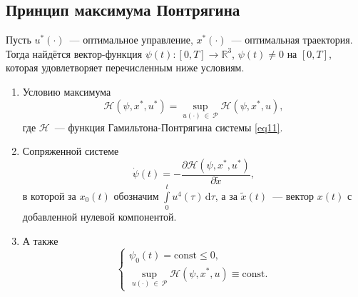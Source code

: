 \documentclass[a4paper,12pt]{article}
\begin{document}
\subsection{Принцип максимума Понтрягина}
Пусть $u^{*}(\cdot)$~--- оптимальное управление, $x^{*}(\cdot)$~--- оптимальная траектория. Тогда найдётся вектор-функция  $\psi(t) \! : [0, T] \rightarrow \mathbb{R}^3$, $\psi(t) \neq 0$ на $[0, T]$, которая удовлетворяет перечисленным ниже условиям.
\begin{enumerate}

\item Условию максимума
\hypertarget{p12}{}
\begin{equation}\label{eq12} 
\mathcal{H}(\psi, x^*, u^*) = \sup_{u(\cdot) \ \in \ \mathcal{P}}{\mathcal{H}(\psi, x^*, u)},
\end{equation} 
где $\mathcal{H}$~--- функция Гамильтона-Понтрягина системы \eqref{eq11}.

\item Сопряженной системе
\hypertarget{p13}{}
\begin{equation}\label{eq13}
\dot{\psi}(t) = - \dfrac{\partial{\mathcal{H}(\psi, x^*, u^*)}}{\partial{\tilde{x}}},
\end{equation}
в которой за $x_0(t)$ обозначим $\int\limits_{0}^{t}{
u^4(\tau)} \, \mathrm{d}\tau$, а за $\tilde{x}(t)$~--- вектор $x(t)$ с добавленной нулевой компонентой.

\item А также
\hypertarget{p15}{}
\begin{equation}\label{eq15}
	\begin{cases}
		\psi_0(t) = \mathrm{const} \leqslant 0, \\
		\sup\limits_{u(\cdot) \ \in \ \mathcal{P}}{\mathcal{H}(\psi, x^*, u)} \equiv \mathrm{const}.
	\end{cases}
\end{equation} 

\end{enumerate}
\end{document}

